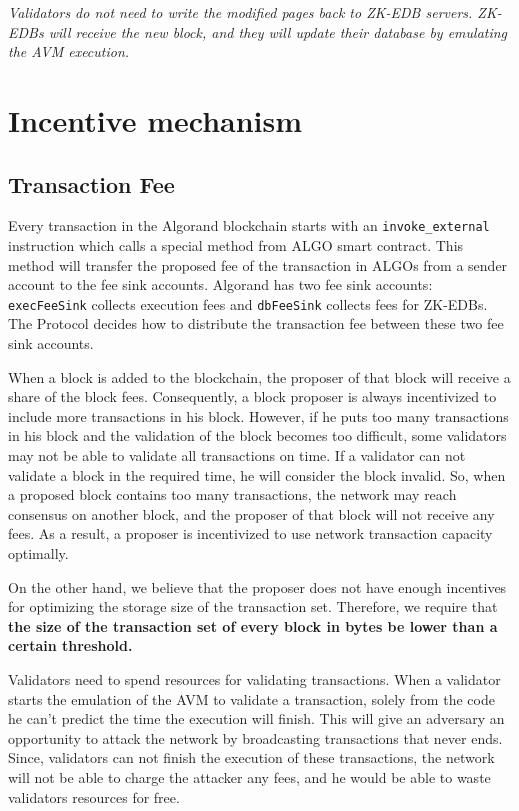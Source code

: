 \documentclass[11pt, A4]{report}
\begin{document}
    \emph{Validators do not need to write the modified pages back to ZK-EDB servers. ZK-EDBs will receive the new
    block, and they will update their database by emulating the AVM execution.}


    \section{Incentive mechanism}\label{incentive-mechanism}

    \subsection{Transaction Fee}\label{subsec:transaction-fee}

    Every transaction in the Algorand blockchain starts with an \texttt{invoke\_external} instruction which calls a
    special method from ALGO smart contract. This method will transfer the proposed fee of the transaction in ALGOs
    from a sender account to the fee sink accounts. Algorand has two fee sink accounts: \texttt{execFeeSink} collects
    execution fees and \texttt{dbFeeSink} collects fees for ZK-EDBs. The Protocol decides how to distribute the
    transaction fee between these two fee sink accounts.

    When a block is added to the blockchain, the proposer of that block will receive a share of the block fees.
    Consequently, a block proposer is always incentivized to include more transactions in his block. However, if he
    puts too many transactions in his block and the validation of the block becomes too difficult, some validators
    may not be able to validate all transactions on time. If a validator can not validate a block in the required
    time, he will consider the block invalid. So, when a proposed block contains too many transactions, the network
    may reach consensus on another block, and the proposer of that block will not receive any fees. As a result, a
    proposer is incentivized to use network transaction capacity optimally.

    On the other hand, we believe that the proposer does not have enough incentives for optimizing the storage size
    of the transaction set. Therefore, we require that \textbf{the size of the transaction set of every block in
    bytes be lower than a certain threshold.}

    Validators need to spend resources for validating transactions. When a validator starts the emulation of the AVM
    to validate a transaction, solely from the code he can't predict the time the execution will finish. This will
    give an adversary an opportunity to attack the network by broadcasting transactions that never ends. Since,
    validators can not finish the execution of these transactions, the network will not be able to charge the
    attacker any fees, and he would be able to waste validators resources for free.
\end{document}
